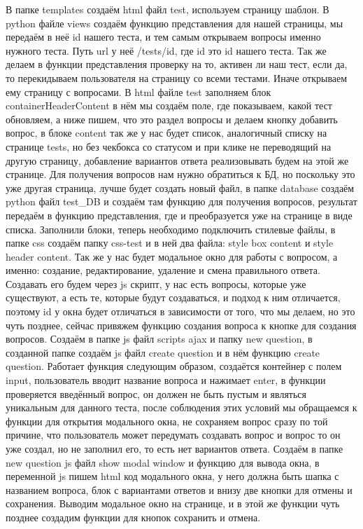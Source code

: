 \documentclass[12pt, oldlfont, amsfonts]{report}
\begin{document}
В папке { templates} создаём html файл {test}, используем страницу шаблон. В python файле views создаём функцию представления для нашей страницы, мы передаём в неё { id} нашего теста, и тем самым открываем вопросы именно нужного теста. Путь url у неё { /tests/id}, где id это id нашего теста. Так же делаем в функции представления проверку на то, активен ли наш тест, если да, то перекидываем пользователя на страницу со всеми тестами. Иначе открываем ему страницу с вопросами. В html файле {test} заполняем блок { containerHeaderContent} в нём мы создаём поле, где показываем, какой тест обновляем, а ниже пишем, что это раздел { вопросы} и делаем кнопку { добавить вопрос}, в блоке { content} так же у нас будет список, аналогичный списку на странице tests, но без чекбокса со статусом и при клике не переводящий на другую страницу, добавление вариантов ответа реализовывать будем на этой же странице. Для получения вопросов нам нужно обратиться к БД, но поскольку это уже другая страница, лучше будет создать новый файл, в папке database создаём python файл { test\_DB} и создаём там функцию для получения вопросов, результат передаём в функцию представления, где и преобразуется уже на странице в виде списка. Заполнили блоки, теперь необходимо подключить стилевые файлы, в папке { css} создаём папку { css-test} и в ней два файла: { style box content} и { style header content}.  Так же у нас будет модальное окно для работы с вопросом, а именно: создание, редактирование, удаление и смена правильного ответа. Создавать его будем через js скрипт, у нас есть вопросы, которые уже существуют, а есть те, которые будут создаваться, и подход к ним отличается, поэтому id у окна будет отличаться в зависимости от того, что мы делаем, но это чуть позднее, сейчас привяжем функцию создания вопроса к кнопке для создания вопросов. Создаём в папке js файл { scripts ajax} и папку {new question}, в созданной папке создаём js файл {create question} и в нём функцию { create question}. Работает функция следующим образом, создаётся контейнер с полем input, пользователь вводит название вопроса и нажимает { enter}, в функции проверяется введённый вопрос, он должен не быть пустым и являться уникальным для данного теста, после соблюдения этих условий мы обращаемся к функции для открытия модального окна, не сохраняем вопрос сразу по той причине, что пользователь может передумать создавать вопрос и вопрос то он уже создал, но не заполнил его, то есть нет вариантов ответа. Создаём в папке { new question} js файл { show modal window} и функцию для вывода окна, в переменной js пишем html код модального окна, у него должна быть шапка с названием вопроса, блок с вариантами ответов и внизу две кнопки для отмены и сохранения. Выводим модальное окно на странице, и в этой же функции чуть позднее создадим функции для кнопок сохранить и отмена.
\end{document}
